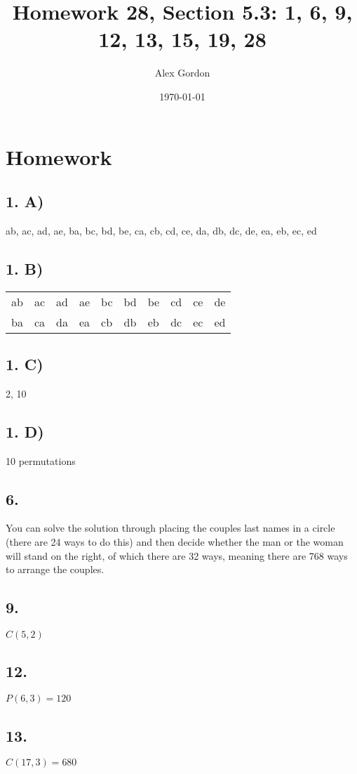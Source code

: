 \documentclass[12]{scrartcl}
\begin{document}
\title{Homework 28, Section 5.3: 1, 6, 9, 12, 13, 15, 19, 28
}
\author{Alex Gordon}
\date{\today}
\maketitle
\section*{Homework}
\subsection*{1. A)}
ab, ac, ad, ae, ba, bc, bd, be, ca, cb, cd, ce, da, db, dc, de, ea, eb, ec, ed
\subsection*{1. B)}
\begin{table}[H]
    \begin{tabular}{|l|l|l|l|l|l|l|l|l|l|}
    \hline
    ab & ac & ad & ae & bc & bd & be & cd & ce & de \\
    ba & ca & da & ea & cb & db & eb & dc & ec & ed \\ \hline
    \end{tabular}
\end{table}
\subsection*{1. C)}
2, 10
\subsection*{1. D)}
10 permutations
\subsection*{6.}
You can solve the solution through placing the couples last names in a circle (there are 24 ways to do this) and then decide whether the man or the woman will stand on the right, of which there are 32 ways, meaning there are 768 ways to arrange the couples. 
\subsection*{9.}
$C(5,2)$
\subsection*{12.}
$P(6, 3) = 120$
\subsection*{13.}
$C(17, 3) = 680$
\end{document}
